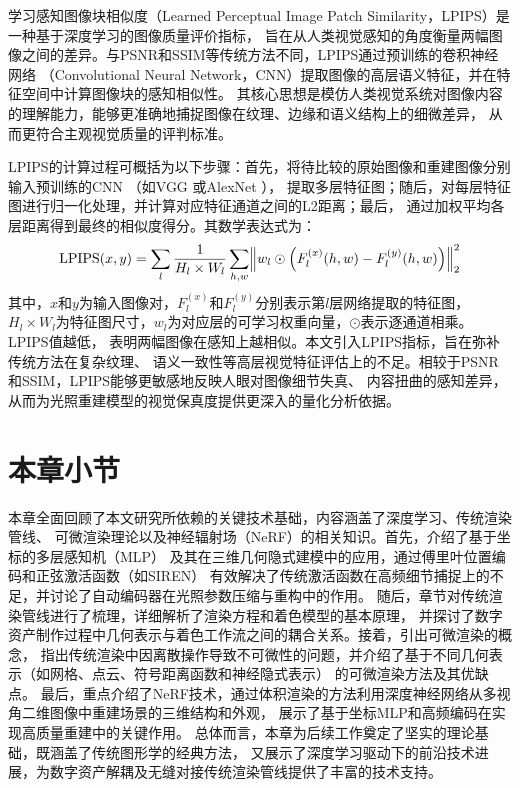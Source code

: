 学习感知图像块相似度（Learned Perceptual Image Patch Similarity，LPIPS）是一种基于深度学习的图像质量评价指标，
旨在从人类视觉感知的角度衡量两幅图像之间的差异。与PSNR和SSIM等传统方法不同，LPIPS通过预训练的卷积神经网络
（Convolutional Neural Network，CNN）提取图像的高层语义特征，并在特征空间中计算图像块的感知相似性。
其核心思想是模仿人类视觉系统对图像内容的理解能力，能够更准确地捕捉图像在纹理、边缘和语义结构上的细微差异，
从而更符合主观视觉质量的评判标准。

LPIPS的计算过程可概括为以下步骤：首先，将待比较的原始图像和重建图像分别输入预训练的CNN
（如VGG \cite{journals/corr/SimonyanZ14a}或AlexNet \cite{NIPS2012_c399862d}），
提取多层特征图；随后，对每层特征图进行归一化处理，并计算对应特征通道之间的L2距离；最后，
通过加权平均各层距离得到最终的相似度得分。其数学表达式为：
\begin{equation}\label{eq:lpips}
  \mathrm{LPIPS}(x,y)=
  \sum_{l}\frac{1}{H_{l}\times W_{l}}
  \sum_{h,w} \Bigl \Vert w_{l} \odot \Bigl(F_{l}^{(x)}(h,w)-F_{l}^{(y)}(h,w) \Bigr) \Bigr \Vert_{2}^{2}
\end{equation}
其中，$x$和$y$为输入图像对，$F_{l}^{(x)}$和$F_{l}^{(y)}$分别表示第$l$层网络提取的特征图，
$H_{l}\times W_{l}$为特征图尺寸，$w_{l}$为对应层的可学习权重向量，$\odot$表示逐通道相乘。LPIPS值越低，
表明两幅图像在感知上越相似。本文引入LPIPS指标，旨在弥补传统方法在复杂纹理、
语义一致性等高层视觉特征评估上的不足。相较于PSNR和SSIM，LPIPS能够更敏感地反映人眼对图像细节失真、
内容扭曲的感知差异，从而为光照重建模型的视觉保真度提供更深入的量化分析依据。

\section{本章小节}
本章全面回顾了本文研究所依赖的关键技术基础，内容涵盖了深度学习、传统渲染管线、
可微渲染理论以及神经辐射场（NeRF）的相关知识。首先，介绍了基于坐标的多层感知机（MLP）
及其在三维几何隐式建模中的应用，通过傅里叶位置编码和正弦激活函数（如SIREN）
有效解决了传统激活函数在高频细节捕捉上的不足，并讨论了自动编码器在光照参数压缩与重构中的作用。
随后，章节对传统渲染管线进行了梳理，详细解析了渲染方程和着色模型的基本原理，
并探讨了数字资产制作过程中几何表示与着色工作流之间的耦合关系。接着，引出可微渲染的概念，
指出传统渲染中因离散操作导致不可微性的问题，并介绍了基于不同几何表示（如网格、点云、符号距离函数和神经隐式表示）
的可微渲染方法及其优缺点。
最后，重点介绍了NeRF技术，通过体积渲染的方法利用深度神经网络从多视角二维图像中重建场景的三维结构和外观，
展示了基于坐标MLP和高频编码在实现高质量重建中的关键作用。
总体而言，本章为后续工作奠定了坚实的理论基础，既涵盖了传统图形学的经典方法，
又展示了深度学习驱动下的前沿技术进展，为数字资产解耦及无缝对接传统渲染管线提供了丰富的技术支持。

